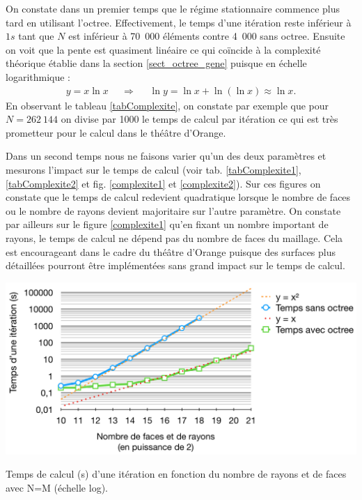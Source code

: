 On constate dans un premier temps que le régime stationnaire commence plus tard en utilisant l'\gls{octree}. Effectivement, le temps d'une itération reste inférieur à $1s$ tant que $N$ est inférieur à 70~000 éléments contre 4~000 sans \gls{octree}. Ensuite on voit que la pente est quasiment linéaire ce qui coïncide à la complexité théorique établie dans la section \ref{sect_octree_gene} puisque en échelle logarithmique :
\begin {align*}
y = x\ln{x}  && \Rightarrow  && \ln{y} = \ln{x} + \ln{(\ln{x})} \approx \ln{x}.
\end{align*}
En observant le tableau \ref{tabComplexite}, on constate par exemple que pour $N = 262~144$ on divise par 1000 le temps de calcul par itération ce qui est très prometteur pour le calcul dans le théâtre d'Orange.

Dans un second temps nous ne faisons varier qu'un des deux paramètres et mesurons l'impact sur le temps de calcul (voir tab. \ref{tabComplexite1},  \ref{tabComplexite2} et fig. \ref{complexite1} et \ref{complexite2}). Sur ces figures on constate que le temps de calcul redevient quadratique lorsque le nombre de faces ou le nombre de rayons devient majoritaire sur l'autre paramètre. On constate par ailleurs sur le figure \ref{complexite1} qu'en fixant un nombre important de rayons, le temps de calcul ne dépend pas du nombre de faces du maillage. Cela est encourageant dans le cadre du théâtre d'Orange puisque des surfaces plus détaillées pourront être implémentées sans grand impact sur le temps de calcul.

 \begin{figureth}
	\includegraphics[width=\linewidth]{images/complexite}
	\caption{Temps de calcul (s) d'une itération en fonction du nombre de rayons et de faces avec N=M (échelle log).}
	\label{complexite}
\end{figureth}

